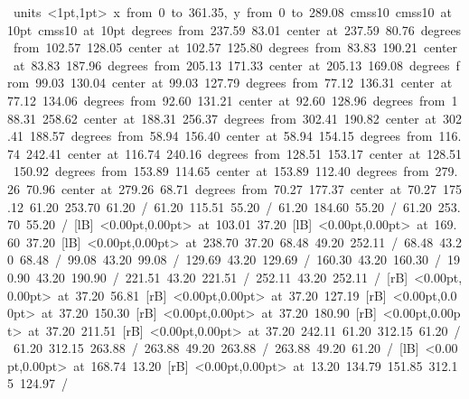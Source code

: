\hbox{\beginpicture
\setcoordinatesystem units <1pt,1pt>
\setplotarea x from 0 to 361.35, y from 0 to 289.08
\setlinear
\font\picfont cmss10\picfont
\font\picfont cmss10 at 10pt\picfont
\font\picfont cmss10 at 10pt\picfont
{} degrees from 237.59 83.01 center at 237.59 80.76
 degrees from 102.57 128.05 center at 102.57 125.80
 degrees from 83.83 190.21 center at 83.83 187.96
 degrees from 205.13 171.33 center at 205.13 169.08
 degrees from 99.03 130.04 center at 99.03 127.79
 degrees from 77.12 136.31 center at 77.12 134.06
 degrees from 92.60 131.21 center at 92.60 128.96
 degrees from 188.31 258.62 center at 188.31 256.37
 degrees from 302.41 190.82 center at 302.41 188.57
 degrees from 58.94 156.40 center at 58.94 154.15
 degrees from 116.74 242.41 center at 116.74 240.16
 degrees from 128.51 153.17 center at 128.51 150.92
 degrees from 153.89 114.65 center at 153.89 112.40
 degrees from 279.26 70.96 center at 279.26 68.71
 degrees from 70.27 177.37 center at 70.27 175.12
\setsolid
{} 61.20 253.70 61.20 /
\setsolid
{} 61.20 115.51 55.20 /
\setsolid
{} 61.20 184.60 55.20 /
\setsolid
{} 61.20 253.70 55.20 /
  [lB] <0.00pt,0.00pt> at 103.01 37.20
  [lB] <0.00pt,0.00pt> at 169.60 37.20
  [lB] <0.00pt,0.00pt> at 238.70 37.20
\setsolid
{} 68.48 49.20 252.11 /
\setsolid
{} 68.48 43.20 68.48 /
\setsolid
{} 99.08 43.20 99.08 /
\setsolid
{} 129.69 43.20 129.69 /
\setsolid
{} 160.30 43.20 160.30 /
\setsolid
{} 190.90 43.20 190.90 /
\setsolid
{} 221.51 43.20 221.51 /
\setsolid
{} 252.11 43.20 252.11 /
 [rB] <0.00pt,0.00pt> at 37.20 56.81
 [rB] <0.00pt,0.00pt> at 37.20 127.19
 [rB] <0.00pt,0.00pt> at 37.20 150.30
 [rB] <0.00pt,0.00pt> at 37.20 180.90
 [rB] <0.00pt,0.00pt> at 37.20 211.51
 [rB] <0.00pt,0.00pt> at 37.20 242.11
\setsolid
{} 61.20 312.15 61.20 /
 61.20 312.15 263.88 /
 263.88 49.20 263.88 /
 263.88 49.20 61.20 /
  [lB] <0.00pt,0.00pt> at 168.74 13.20
 [rB] <0.00pt,0.00pt> at 13.20 134.79
\setsolid
{} 151.85 312.15 124.97 /
\endpicture
}
